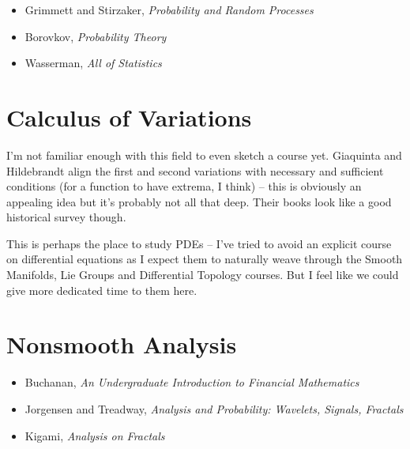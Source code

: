 \documentclass[article]{article}
\begin{document}
\begin{itemize}
	\item{Grimmett and Stirzaker, \textit{Probability and Random Processes}}
	\item{Borovkov, \textit{Probability Theory}}
	\item{Wasserman, \textit{All of Statistics}}
\end{itemize}

\section{Calculus of Variations}

I'm not familiar enough with this field to even sketch a course yet. Giaquinta and Hildebrandt align the first and second variations with necessary and sufficient conditions (for a function to have extrema, I think) -- this is obviously an appealing idea but it's probably not all that deep. Their books look like a good historical survey though.

This is perhaps the place to study PDEs -- I've tried to avoid an explicit course on differential equations as I expect them to naturally weave through the Smooth Manifolds, Lie Groups and Differential Topology courses. But I feel like we could give more dedicated time to them here.

\section{Nonsmooth Analysis}

\begin{itemize}
	\item{Buchanan, \textit{An Undergraduate Introduction to Financial Mathematics}}
	\item{Jorgensen and Treadway, \textit{Analysis and Probability: Wavelets, Signals, Fractals}}
	\item{Kigami, \textit{Analysis on Fractals}}
\end{itemize}


	
\end{document}
